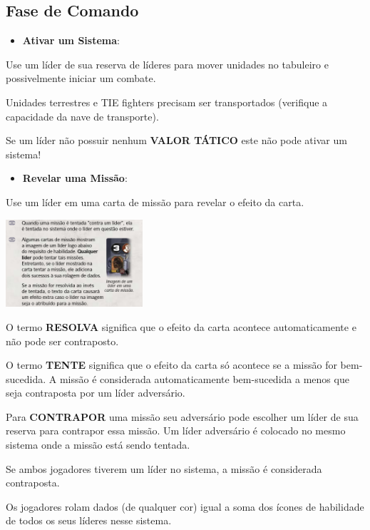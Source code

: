 \documentclass[11pt]{article}
\begin{document}
\subsection{Fase de Comando}
\label{sec:org013b58c}

\begin{itemize}
\item \textbf{Ativar um Sistema}:
\end{itemize}

Use um líder de sua reserva de líderes para mover unidades no tabuleiro e possivelmente iniciar um combate.

Unidades terrestres e TIE fighters precisam ser transportados (verifique a capacidade da nave de transporte).

Se um líder não possuir nenhum \textbf{VALOR TÁTICO} este não pode ativar um sistema!

\begin{itemize}
\item \textbf{Revelar uma Missão}:
\end{itemize}

Use um líder em uma carta de missão para revelar o efeito da carta.

\begin{center}
\includegraphics[width=2.0in]{./lider-effect.png}
\end{center}

O termo \textbf{RESOLVA} significa que o efeito da carta acontece automaticamente e não pode ser contraposto.

O termo \textbf{TENTE} significa que o efeito da carta só acontece se a missão for bem-sucedida. A missão é considerada automaticamente bem-sucedida a menos que seja contraposta por um líder adversário.

Para \textbf{CONTRAPOR} uma missão seu adversário pode escolher um líder de sua reserva para contrapor essa missão. Um líder adversário é colocado no mesmo sistema onde a missão está sendo tentada.

Se ambos jogadores tiverem um líder no sistema, a missão é considerada contraposta.

Os jogadores rolam dados (de qualquer cor) igual a soma dos ícones de habilidade de todos os seus líderes nesse sistema.
\end{document}
